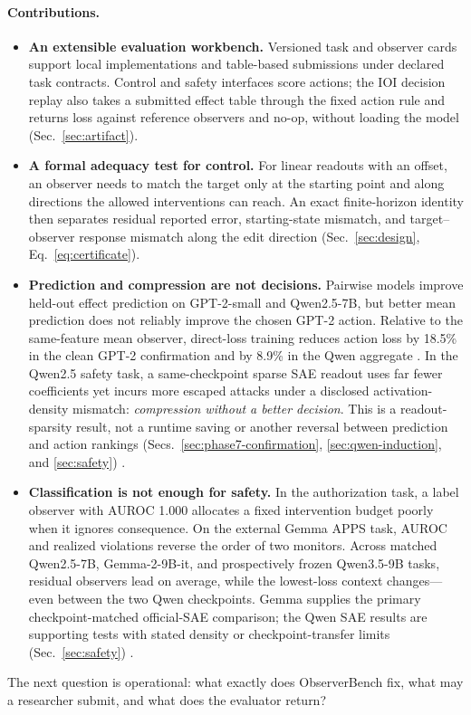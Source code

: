 \paragraph{Contributions.}

\begin{itemize}[itemsep=0.2em,topsep=0.3em]
  \item \textbf{An extensible evaluation workbench.} Versioned task and
  observer cards support local implementations and table-based submissions
  under declared task contracts. Control and safety interfaces score actions;
  the IOI decision replay also takes a submitted effect table through the
  fixed action rule and returns loss against reference observers and no-op,
  without loading the model (Sec.~\ref{sec:artifact}).

  \item \textbf{A formal adequacy test for control.} For linear readouts with
  an offset, an observer needs to match the target only at the starting point
  and along directions the allowed interventions can reach. An exact
  finite-horizon identity then separates residual reported error,
  starting-state mismatch, and target--observer response mismatch along the
  edit direction (Sec.~\ref{sec:design}, Eq.~\ref{eq:certificate}).

  \item \textbf{Prediction and compression are not decisions.} Pairwise
  models improve held-out effect prediction on GPT-2-small and Qwen2.5-7B, but
  better mean prediction does not reliably improve the chosen GPT-2 action.
  Relative to the same-feature mean observer, direct-loss training reduces
  action loss by 18.5\% in the clean GPT-2 confirmation and by 8.9\% in the
  Qwen aggregate \cite{wang2023ioi,olsson2022induction,qwen2024qwen25}. In the
  Qwen2.5 safety task, a same-checkpoint sparse SAE readout uses far fewer
  coefficients yet incurs more escaped attacks under a disclosed
  activation-density mismatch: \emph{compression without a better decision}.
  This is a readout-sparsity result, not a runtime saving or another reversal
  between prediction and action rankings
  (Secs.~\ref{sec:phase7-confirmation}, \ref{sec:qwen-induction}, and
  \ref{sec:safety}) \cite{kantamneni2025saeprobes}.

  \item \textbf{Classification is not enough for safety.} In the authorization
  task, a label observer with AUROC 1.000 allocates a fixed intervention budget
  poorly when it ignores consequence. On the external Gemma APPS task, AUROC
  and realized violations reverse the order of two monitors. Across matched
  Qwen2.5-7B, Gemma-2-9B-it, and prospectively frozen Qwen3.5-9B tasks, residual
  observers lead on average, while the lowest-loss context changes---even
  between the two Qwen checkpoints. Gemma supplies the primary
  checkpoint-matched official-SAE comparison; the Qwen SAE results are
  supporting tests with stated density or checkpoint-transfer limits
  (Sec.~\ref{sec:safety})
  \cite{greenblatt2024aicontrol,inglis2025controlarena,
  gemmateam2024gemma2,lieberum2024gemmascope}.
\end{itemize}

The next question is operational: what exactly does ObserverBench fix, what
may a researcher submit, and what does the evaluator return?
